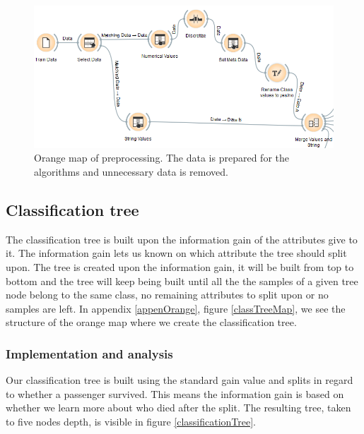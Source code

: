 \documentclass[a4paper,11pt]{article}
\begin{document}
\begin{figure}[h]
	\begin{center}
	\includegraphics[scale=0.7]{PreprocessMap}
	\end{center}
	\caption{Orange map of preprocessing. The data is prepared for the algorithms and unnecessary data is removed.}
	\label{preprocessMap}
\end{figure}

\subsection{Classification tree}
The classification tree\cite{ClassificationTree} is built upon the information gain of the attributes give to it. The information gain lets us known on which attribute the tree should split upon.
The tree is created upon the information gain, it will be built from top to bottom and the tree will keep being built until all the the samples of a given tree node belong to the same class, no remaining attributes to split upon or no samples are left. In appendix \ref{appenOrange}, figure \ref{classTreeMap}, we see the structure of the orange map where we create the classification tree. 

\subsubsection{Implementation and analysis}
Our classification tree is built using the standard gain value and splits in regard to whether a passenger survived. This means the information gain is based on whether we learn more about who died after the split. The resulting tree, taken to five nodes depth, is visible in figure \ref{classificationTree}.
\end{document}
